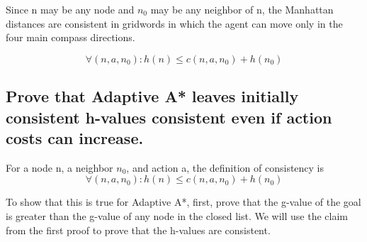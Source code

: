 \documentclass{article}
\begin{document}
Since n may be any node and $n_0$ may be any neighbor of n, the Manhattan distances are consistent in gridwords in which the agent can move only in the four main compass directions.

\[ \forall (n,a,n_0): h(n) \leq  c(n,a,n_0)+h(n_0)\]

\subsection{Prove that Adaptive A* leaves initially consistent h-values consistent even if action costs can increase.}

For a node n, a neighbor $n_0$, and action a, the definition of consistency is \[ \forall (n,a,n_0): h(n) \leq  c(n,a,n_0)+h(n_0)\]

To show that this is true for Adaptive A*, first, prove that the g-value of the goal is greater than the g-value of any node in the closed list. We will use the claim from the first proof to prove that the h-values are consistent.
\end{document}
